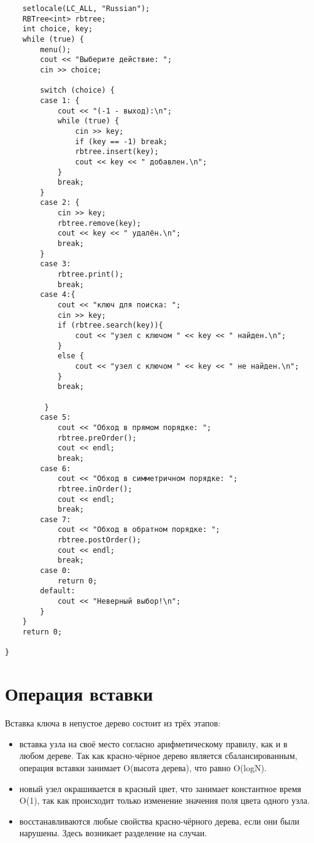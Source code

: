 \documentclass[bachelor, och, referat, times]{SCWorks}
\begin{document}
\begin{verbatim}
    setlocale(LC_ALL, "Russian");
    RBTree<int> rbtree;
    int choice, key;
    while (true) {
        menu();
        cout << "Выберите действие: ";
        cin >> choice;

        switch (choice) {
        case 1: {
            cout << "(-1 - выход):\n";
            while (true) {
                cin >> key;
                if (key == -1) break;
                rbtree.insert(key);
                cout << key << " добавлен.\n";
            }
            break;
        }
        case 2: {
            cin >> key;
            rbtree.remove(key);
            cout << key << " удалён.\n";
            break;
        }
        case 3:
            rbtree.print();
            break;
        case 4:{
            cout << "ключ для поиска: ";
            cin >> key;
            if (rbtree.search(key)){
                cout << "узел с ключом " << key << " найден.\n";
            }
            else {
                cout << "узел с ключом " << key << " не найден.\n";
            }
            break;

         }
        case 5:
            cout << "Обход в прямом порядке: ";
            rbtree.preOrder();
            cout << endl;
            break;
        case 6:
            cout << "Обход в симметричном порядке: ";
            rbtree.inOrder();
            cout << endl;
            break;
        case 7:
            cout << "Обход в обратном порядке: ";
            rbtree.postOrder();
            cout << endl;
            break;
        case 0:
            return 0;
        default:
            cout << "Неверный выбор!\n";
        }
    }
    return 0;
    
}

 \end{verbatim}




\section{Операция вставки}

Вставка ключа в непустое дерево состоит из трёх этапов:

\begin{itemize}
   
 \item вставка узла на своё место согласно арифметическому правилу, как и в любом дереве. 
Так как красно-чёрное дерево является сбалансированным, операция вставки занимает O(высота дерева), 
что равно O(logN). 

 \item новый узел окрашивается в красный цвет, что занимает константное время O(1), 
так как происходит только изменение значения поля цвета одного узла. 

 \item восстанавливаются любые свойства красно-чёрного дерева, если они были нарушены. 
Здесь возникает разделение на случаи.

\end{itemize}
\end{document}
